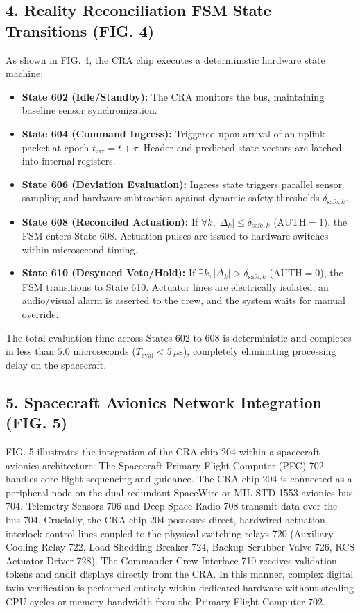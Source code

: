 \documentclass[12pt,a4paper]{article}
\begin{document}
\subsection*{4. Reality Reconciliation FSM State Transitions (FIG. 4)}
As shown in FIG. 4, the CRA chip executes a deterministic hardware state machine:
\begin{itemize}
    \item \textbf{State 602 (Idle/Standby):} The CRA monitors the bus, maintaining baseline sensor synchronization.
    \item \textbf{State 604 (Command Ingress):} Triggered upon arrival of an uplink packet at epoch $t_{\text{arr}} = t + \tau$. Header and predicted state vectors are latched into internal registers.
    \item \textbf{State 606 (Deviation Evaluation):} Ingress state triggers parallel sensor sampling and hardware subtraction against dynamic safety thresholds $\delta_{\text{safe},k}$.
    \item \textbf{State 608 (Reconciled Actuation):} If $\forall k, |\Delta_k| \le \delta_{\text{safe},k}$ ($\text{AUTH} = 1$), the FSM enters State 608. Actuation pulses are issued to hardware switches within microsecond timing.
    \item \textbf{State 610 (Desynced Veto/Hold):} If $\exists k, |\Delta_k| > \delta_{\text{safe},k}$ ($\text{AUTH} = 0$), the FSM transitions to State 610. Actuator lines are electrically isolated, an audio/visual alarm is asserted to the crew, and the system waits for manual override.
\end{itemize}
The total evaluation time across States 602 to 608 is deterministic and completes in less than $5.0$ microseconds ($T_{\text{eval}} < 5\,\mu\text{s}$), completely eliminating processing delay on the spacecraft.

\subsection*{5. Spacecraft Avionics Network Integration (FIG. 5)}
FIG. 5 illustrates the integration of the CRA chip 204 within a spacecraft avionics architecture:
The Spacecraft Primary Flight Computer (PFC) 702 handles core flight sequencing and guidance. The CRA chip 204 is connected as a peripheral node on the dual-redundant SpaceWire or MIL-STD-1553 avionics bus 704. Telemetry Sensors 706 and Deep Space Radio 708 transmit data over the bus 704. 
Crucially, the CRA chip 204 possesses direct, hardwired actuation interlock control lines coupled to the physical switching relays 720 (Auxiliary Cooling Relay 722, Load Shedding Breaker 724, Backup Scrubber Valve 726, RCS Actuator Driver 728). The Commander Crew Interface 710 receives validation tokens and audit displays directly from the CRA. In this manner, complex digital twin verification is performed entirely within dedicated hardware without stealing CPU cycles or memory bandwidth from the Primary Flight Computer 702.
\end{document}
